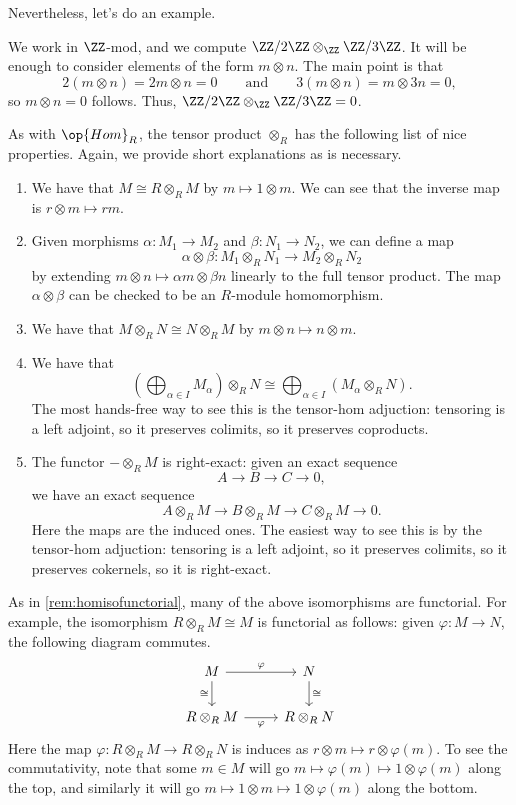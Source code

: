 \documentclass[../notes.tex]{subfiles}
\begin{document}
Nevertheless, let's do an example.
\begin{example}
	We work in $\ZZ$-mod, and we compute $\ZZ/2\ZZ\otimes_\ZZ\ZZ/3\ZZ$. It will be enough to consider elements of the form $m\otimes n$. The main point is that
	\[2(m\otimes n)=2m\otimes n=0\qquad\text{and}\qquad3(m\otimes n)=m\otimes3n=0,\]
	so $m\otimes n=0$ follows. Thus, $\ZZ/2\ZZ\otimes_\ZZ\ZZ/3\ZZ=0$.
\end{example}
As with $\op{Hom}_R$, the tensor product $\otimes_R$ has the following list of nice properties. Again, we provide short explanations as is necessary.
\begin{enumerate}
	\item We have that $M\cong R\otimes_RM$ by $m\mapsto1\otimes m$. We can see that the inverse map is $r\otimes m\mapsto rm$.
	\item Given morphisms $\alpha:M_1\to M_2$ and $\beta:N_1\to N_2$, we can define a map
	\[\alpha\otimes\beta:M_1\otimes_R N_1\to M_2\otimes_R N_2\]
	by extending $m\otimes n\mapsto\alpha m\otimes\beta n$ linearly to the full tensor product. The map $\alpha\otimes\beta$ can be checked to be an $R$-module homomorphism.
	\item We have that $M\otimes_R N\cong N\otimes_R M$ by $m\otimes n\mapsto n\otimes m$.
	\item We have that
	\[\left(\bigoplus_{\alpha\in I}M_\alpha\right)\otimes_RN\cong\bigoplus_{\alpha\in I}(M_\alpha\otimes_R N).\]
	The most hands-free way to see this is the tensor-hom adjuction: tensoring is a left adjoint, so it preserves colimits, so it preserves coproducts.
	\item The functor $-\otimes_RM$ is right-exact: given an exact sequence
	\[A\to B\to C\to 0,\]
	we have an exact sequence
	\[A\otimes_RM\to B\otimes_RM\to C\otimes_RM\to 0.\]
	Here the maps are the induced ones. The easiest way to see this is by the tensor-hom adjuction: tensoring is a left adjoint, so it preserves colimits, so it preserves cokernels, so it is right-exact.
\end{enumerate}
\begin{remark}[Nir] \label{rem:tensorisofunctorial}
	As in \autoref{rem:homisofunctorial}, many of the above isomorphisms are functorial. For example, the isomorphism $R\otimes_RM\cong M$ is functorial as follows: given $\varphi:M\to N$, the following diagram commutes.
	\[\begin{tikzcd}
		M & N \\
		{R\otimes_RM} & {R\otimes_RN}
		\arrow["\cong"', from=1-1, to=2-1]
		\arrow["\cong", from=1-2, to=2-2]
		\arrow["\varphi", from=1-1, to=1-2]
		\arrow["\varphi"', from=2-1, to=2-2]
	\end{tikzcd}\]
	Here the map $\varphi:R\otimes_RM\to R\otimes_RN$ is induces as $r\otimes m\mapsto r\otimes\varphi(m)$. To see the commutativity, note that some $m\in M$ will go $m\mapsto\varphi(m)\mapsto1\otimes\varphi(m)$ along the top, and similarly it will go $m\mapsto1\otimes m\mapsto1\otimes\varphi(m)$ along the bottom.
\end{remark}
\end{document}
